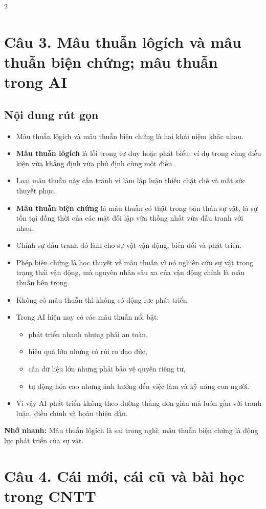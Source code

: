 \documentclass[9pt,a4paper]{extarticle}
\begin{document}
\begin{multicols*}{2}
\section*{Câu 3. Mâu thuẫn lôgích và mâu thuẫn biện chứng; mâu thuẫn trong AI}
\subsection*{Nội dung rút gọn}
\begin{itemize}
  \item Mâu thuẫn lôgích và mâu thuẫn biện chứng là hai khái niệm khác nhau.
  \item \textbf{Mâu thuẫn lôgích} là lỗi trong tư duy hoặc phát biểu; ví dụ trong cùng điều kiện vừa khẳng định vừa phủ định cùng một điều.
  \item Loại mâu thuẫn này cần tránh vì làm lập luận thiếu chặt chẽ và mất sức thuyết phục.
  \item \textbf{Mâu thuẫn biện chứng} là mâu thuẫn có thật trong bản thân sự vật, là sự tồn tại đồng thời của các mặt đối lập vừa thống nhất vừa đấu tranh với nhau.
  \item Chính sự đấu tranh đó làm cho sự vật vận động, biến đổi và phát triển.
  \item Phép biện chứng là học thuyết về mâu thuẫn vì nó nghiên cứu sự vật trong trạng thái vận động, mà nguyên nhân sâu xa của vận động chính là mâu thuẫn bên trong.
  \item Không có mâu thuẫn thì không có động lực phát triển.
  \item Trong AI hiện nay có các mâu thuẫn nổi bật:
  \begin{itemize}
    \item phát triển nhanh nhưng phải an toàn,
    \item hiệu quả lớn nhưng có rủi ro đạo đức,
    \item cần dữ liệu lớn nhưng phải bảo vệ quyền riêng tư,
    \item tự động hóa cao nhưng ảnh hưởng đến việc làm và kỹ năng con người.
  \end{itemize}
  \item Vì vậy AI phát triển không theo đường thẳng đơn giản mà luôn gắn với tranh luận, điều chỉnh và hoàn thiện dần.
\end{itemize}

\textbf{Nhớ nhanh:} Mâu thuẫn lôgích là sai trong nghĩ; mâu thuẫn biện chứng là động lực phát triển của sự vật.

\section*{Câu 4. Cái mới, cái cũ và bài học trong CNTT}

\end{multicols*}
\end{document}
